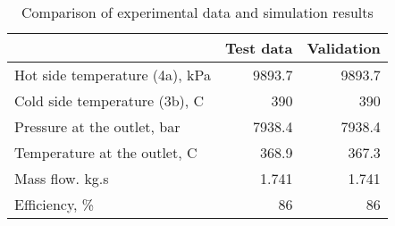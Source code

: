 \begin{table}
\label{tab:Comparison}
\caption{Comparison of experimental data and simulation results}
\begin{center}
\begin{tabulary}{0.9\textwidth}{LRR}
\toprule
& Test data \cite{Iverson_2013}  & Validation \\
\midrule
Hot side temperature (4a), kPa & 9893.7 & 9893.7 \\
Cold side temperature (3b), C & 390 & 390 \\
Pressure at the outlet, bar & 7938.4 & 7938.4 \\
Temperature at the outlet, C & 368.9 & 367.3 \\
Mass flow. kg.s & 1.741 & 1.741 \\
Efficiency, \% & 86 & 86 \\
\bottomrule
\end{tabulary}
\end{center}
\end{table}